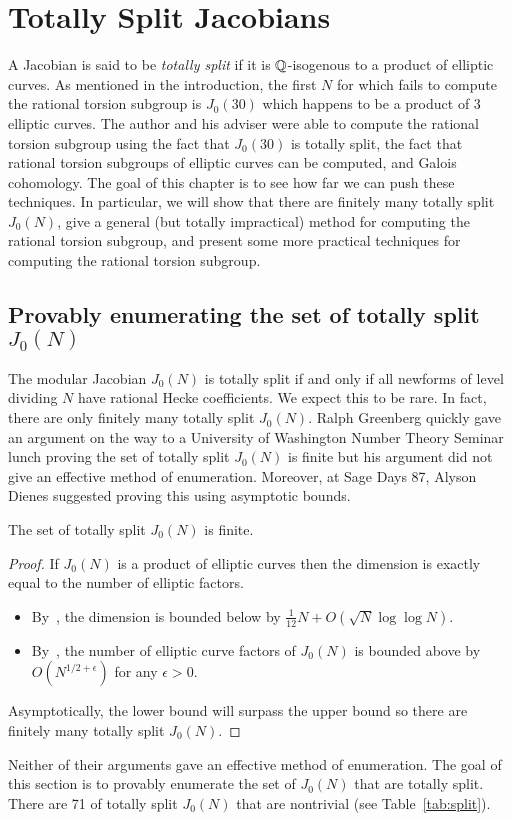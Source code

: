 \chapter{Totally Split Jacobians}%
\label{chap:totally_split}

A Jacobian is said to be \emph{totally split} if it is $\mathbb{Q}$-isogenous to a
product of elliptic curves. As mentioned in the introduction, the first $N$ for
which \sage fails to compute the rational torsion subgroup is $J_0(30)$ which
happens to be a product of 3 elliptic curves. The author and his adviser were
able to compute the rational torsion subgroup using the fact that $J_0(30)$ is
totally split, the fact that rational torsion subgroups of elliptic curves can
be computed, and Galois cohomology. The goal of this chapter is to see how far
we can push these techniques. In particular, we will show that there are
finitely many totally split $J_0(N)$, give a general (but totally impractical)
method for computing the rational torsion subgroup, and present some more
practical techniques for computing the rational torsion subgroup.


\section{Provably enumerating the set of totally split $J_0(N)$}
\label{sec:provably_enumerating}

The modular Jacobian $J_0(N)$ is totally split if and only if all newforms of
level dividing $N$ have rational Hecke coefficients. We expect this to be rare.
In fact, there are only finitely many totally split $J_0(N)$. Ralph Greenberg
quickly gave an argument on the way to a University of Washington Number
Theory Seminar lunch proving the set of totally split $J_0(N)$ is finite but
his argument did not give an effective method of enumeration. Moreover, at Sage
Days 87, Alyson Dienes suggested proving this using asymptotic bounds.
\begin{proposition}%
    \label{prop:totally_split}
    The set of totally split $J_0(N)$ is finite.
\end{proposition}
\begin{proof}
    If $J_0(N)$ is a product of elliptic curves then the dimension is
    exactly equal to the number of elliptic factors.
    \begin{itemize}
        \item
            By~\cite[Thm. 6]{martin:dimension}, the dimension is bounded below
            by $\frac{1}{12}N + O(\sqrt{N}\log\log N)$.
        \item
            By~\cite[Cor. 2]{brumer-silverman:number}, the number of elliptic
            curve factors of $J_0(N)$ is bounded above by $O(N^{1/2+\epsilon})$
            for any $\epsilon>0$.
    \end{itemize}
    Asymptotically, the lower bound will surpass the upper bound so there are
    finitely many totally split $J_0(N)$.
\end{proof}
Neither of their arguments gave an effective method of enumeration. The goal of
this section is to provably enumerate the set of $J_0(N)$ that are totally
split. There are 71 of totally split $J_0(N)$ that are nontrivial (see
Table~\ref{tab:split}).

